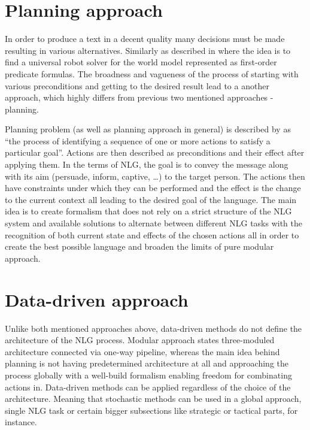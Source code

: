 \section{Planning approach}
In order to produce a text in a decent quality many decisions must be made resulting in various alternatives. Similarly as described in \cite{fikes1971strips} where the idea is to find a universal robot solver for the world model represented as first-order predicate formulas. The broadness and vagueness of the process of starting with various preconditions and getting to the desired result lead to a another approach, which highly differs from previous two mentioned approaches - planning.

Planning problem (as well as planning approach in general) is described by \cite{gatt2018survey} as “the process of identifying a sequence of one or more actions to satisfy a particular goal”. Actions are then described as preconditions and their effect after applying them. In the terms of NLG, the goal is to convey the message along with its aim (persuade, inform, captive, …) to the target person. The actions then have constraints under which they can be performed and the effect is the change to the current context all leading to the desired goal of the language. The main idea is to create formalism that does not rely on a strict structure of the NLG system and available solutions to alternate between different NLG tasks with the recognition of both current state and effects of the chosen actions all in order to create the best possible language and broaden the limits of pure modular approach. 

\section{Data-driven approach}
Unlike both mentioned approaches above, data-driven methods do not define the architecture of the NLG process. Modular approach states three-moduled architecture connected via one-way pipeline, whereas the main idea behind planning is not having predetermined architecture at all and approaching the process globally with a well-build formalism enabling freedom for combinating actions in. Data-driven methods can be applied regardless of the choice of the architecture. Meaning that stochastic methods can be used in a global approach, single NLG task or certain bigger subsections like strategic or tactical parts, for instance.


